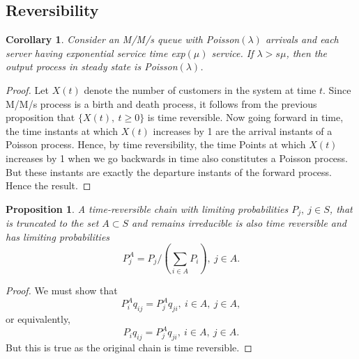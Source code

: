 \documentclass[a4paper,10pt]{article}
\theoremstyle{plain}
\newtheorem{prop}[thm]{Proposition}
\newtheorem{cor}[thm]{Corollary}
\theoremstyle{definition}
\theoremstyle{remark}
\begin{document}
\subsection{Reversibility}
\begin{cor}
Consider an M/M/s queue with Poisson$(\lambda)$ arrivals and each server having exponential service time exp$(\mu)$ service. If $\lambda > s \mu$, then the output process in steady state is Poisson$(\lambda)$.
\end{cor}
\begin{proof}
Let $X(t)$ denote the number of customers in the system at time $t$. Since M/M/s process is a birth and death process, it follows from the previous proposition that $\{X(t),~t \geq 0\}$ is time reversible. Now going forward in time, the time instants at which $X(t)$ increases by 1 are the arrival instants of a Poisson process. Hence, by time reversibility, the time Points at which $X(t)$ increases by 1 when we go backwards in time also constitutes a Poisson process. But these instants are exactly the departure instants of the forward process. Hence the result.
\end{proof}
\begin{prop}
A time-reversible chain with limiting probabilities $P_j,~ j \in S$, that is truncated to the set $A\subset S$ and remains irreducible is also time reversible and has limiting probabilities 
\begin{equation}
P_j^A=P_j/(\sum_{i \in A}P_i),~ j \in A.
\end{equation}
\end{prop}
\begin{proof}
We must show that 
\begin{equation*}
P_i^Aq_{ij}=P_j^Aq_{ji},~ i \in A,~ j \in A,
\end{equation*}
or equivalently,
\begin{equation*}
P_iq_{ij}=P_j^Aq_{ji},~ i \in A,~ j \in A.
\end{equation*}
But this is true as the original chain is time reversible.
\end{proof}
\end{document}
